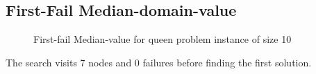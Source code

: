 \documentclass[a4paper, 11pt]{article}
\begin{document}
\subsection*{First-Fail Median-domain-value}
\begin{figure}[H]
  \begin{center}
    \caption{First-fail Median-value for queen problem instance of size 10}
    \label{fig:ffmv10}
  \end{center}
\end{figure}
The search visits 7 nodes and 0 failures before finding the first solution.
\end{document}
